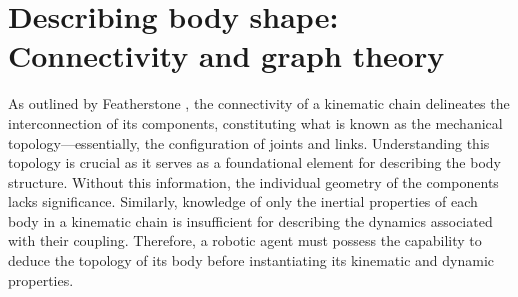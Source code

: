 
\section{Describing body shape: Connectivity and graph theory}

As outlined by Featherstone \cite{Featherstone2007RigidBodyDynamics}, the connectivity of a kinematic chain delineates the interconnection of its components, constituting what is known as the mechanical topology---essentially, the configuration of joints and links. Understanding this topology is crucial as it serves as a foundational element for describing the body structure. Without this information, the individual geometry of the components lacks significance. Similarly, knowledge of only the inertial properties of each body in a kinematic chain is insufficient for describing the dynamics associated with their coupling. Therefore, a robotic agent must possess the capability to deduce the topology of its body before instantiating its kinematic and dynamic properties.


